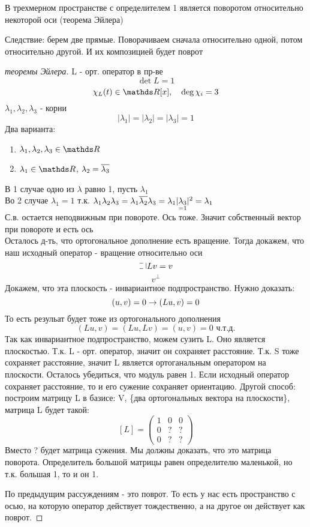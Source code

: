 \documentclass[12pt, fleqn]{article}
\begin{document}
	\begin{utv}
		В трехмерном пространстве с определителем 1 является поворотом относительно некоторой оси (теорема Эйлера)
	\end{utv}

	Следствие: берем две прямые. Поворачиваем сначала относительно одной, потом относительно другой. И их композицией будет поврот

	\begin{proof}[теоремы Эйлера]
		L - орт. оператор в пр-ве
		\[\det L = 1\]
		\[\chi_L(t) \in \R[x],\q \deg \chi_i = 3\]
		$\lambda_1, \lambda_2, \lambda_3$ - корни
		\[|\lambda_1| = |\lambda_2| = |\lambda_3| = 1\]
		Два варианта:
		\begin{enumerate}
			\item $\lambda_1, \lambda_2, \lambda_3 \in \R$
			\item $\lambda_1 \in \R$, $\lambda_2 = \overline{\lambda_3}$
		\end{enumerate}
		В 1 случае одно из $\lambda$ равно 1, пусть $\lambda_1$\\
		Во 2 случае $\lambda_1 = 1$ т.к. $\lambda_1 \lambda_2 \lambda_3 = \lambda_1 \overline{\lambda_2} \lambda_3 = \lambda_1 |\underset{=1}{\lambda_3}|^2 = \lambda_1$\\
		С.в. остается неподвижным при повороте. Ось тоже. Значит собственный вектор  при повороте и есть ось\\
		Осталось д-ть, что ортогональное дополнение есть вращение. Тогда докажем, что наш исходный оператор - вращение относительно оси
		\[\letus Lv = v\]
		\[v^{\bot}\]
		Докажем, что эта плоскость - инвариантное подпространство. Нужно доказать:
		\[(u,v) = 0 \rightarrow (Lu, v) = 0\]
		То есть резульат будет тоже из ортогонального дополнения
		\[(Lu,v) = (Lu, Lv) = (u,v) = 0 \text{ ч.т.д.}\]
		Так как инвариантное подпространство, можем сузить L. Оно является плоскостью. Т.к. L - орт. оператор, значит он сохраняет расстояние. Т.к. S тоже сохраняет расстояние, значит L является ортоганальным оператором на плоскости. Осталось убедиться, что модуль равен 1. Если исходный оператор сохраняет расстояние, то и его сужение сохраняет ориентацию. Другой способ: построим матрицу L в базисе: V, \{два ортогональных вектора на плоскости\}, матрица L будет такой:\\
		\[[L] = \begin{pmatrix}
			1 & 0 & 0\\
			0 & ? & ?\\
			0 & ? & ?
		\end{pmatrix}\]
		Вместо ? будет матрица сужения. Мы должны доказать, что это матрица поворота. Определитель большой матрицы равен определителю маленькой, но т.к. большая 1, то и он 1.

		По предыдущим рассуждениям - это поврот. То есть у нас есть пространство с осью, на которую оператор действует тождественно, а на другое он действует как поврот.
	\end{proof}
\end{document}
